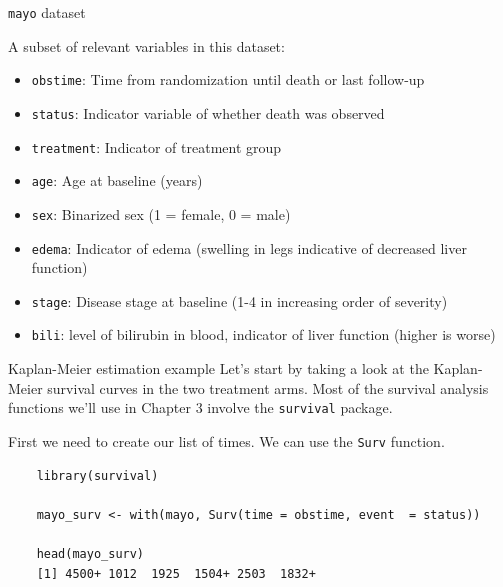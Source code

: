 \documentclass[10pt,t]{beamer}
\begin{document}
\begin{frame}{\texttt{mayo} dataset}
	
	\vspace{-5 mm}
	
	A subset of relevant variables in this dataset:
	
	\medskip
	
	\begin{itemize}
		\item \texttt{obstime}: Time from randomization until death or last follow-up
		
		\medskip
		
		\item \texttt{status}: Indicator variable of whether death was observed
		
		\medskip
		
		\item \texttt{treatment}: Indicator of treatment group
		
		\medskip
		
		\item \texttt{age}: Age at baseline (years)
		
		\medskip
		
		\item \texttt{sex}: Binarized sex (1 = female, 0 = male)
		
		\medskip
		
		\item \texttt{edema}: Indicator of edema (swelling in legs indicative of decreased liver function)
		
		\medskip
		
		\item \texttt{stage}: Disease stage at baseline (1-4 in increasing order of severity)
		\medskip
		
		\item \texttt{bili}: level of bilirubin in blood, indicator of liver function (higher is worse) 
	\end{itemize}

\end{frame}

\begin{frame}[fragile]{Kaplan-Meier estimation example}
	Let's start by taking a look at the Kaplan-Meier survival curves in the two treatment arms. Most of the survival analysis functions we'll use in Chapter 3 involve the \texttt{survival} package.
	
	\medskip
	
	First we need to create our list of times. We can use the \texttt{Surv} function. 
	
	\small
	
	\begin{verbatim}
	library(survival)
	
	mayo_surv <- with(mayo, Surv(time = obstime, event  = status))
	
	head(mayo_surv)
	[1] 4500+ 1012  1925  1504+ 2503  1832+
	\end{verbatim}
\end{frame}
\end{document}

